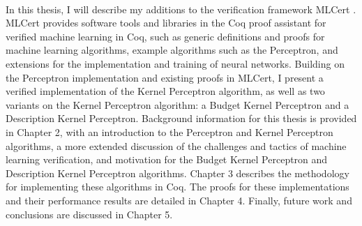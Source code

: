 \\In this thesis, I will describe my additions to the verification framework MLCert \cite{MLC}. MLCert provides software tools and libraries in the Coq proof assistant for verified machine learning in Coq, such as generic definitions and proofs for machine learning algorithms, example algorithms such as the Perceptron, and extensions for the implementation and training of neural networks. Building on the Perceptron implementation and existing proofs in MLCert, I present a verified implementation of the Kernel Perceptron algorithm, as well as two variants on the Kernel Perceptron algorithm: a Budget Kernel Perceptron and a Description Kernel Perceptron. Background information for this thesis is provided in Chapter 2, with an introduction to the Perceptron and Kernel Perceptron algorithms, a more extended discussion of the challenges and tactics of machine learning verification, and motivation for the Budget Kernel Perceptron and Description Kernel Perceptron algorithms. Chapter 3 describes the methodology for implementing these algorithms in Coq. The proofs for these implementations and their performance results are detailed in Chapter 4. Finally, future work and conclusions are discussed in Chapter 5.


